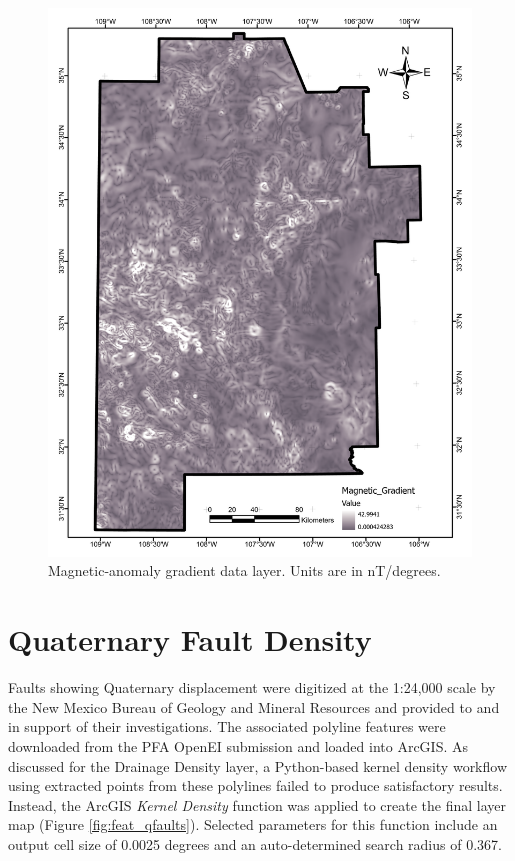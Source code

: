 \begin{figure}[H]
\centering
\includegraphics[width=0.75\linewidth]{templates/images/Figure-MagneticGradient.pdf}
\caption[Magnetic-anomaly gradient data layer]{Magnetic-anomaly gradient data layer. Units are in nT/degrees.}
\label{fig:feat_magnetic_gradient}
\end{figure}
\pagebreak

\section{Quaternary Fault Density}\label{app:dl_quat_fault_density}
Faults showing Quaternary displacement were digitized at the 1:24,000 scale by the New Mexico Bureau of Geology and Mineral Resources and provided to \citet{bielicki_hydrogeolgic_2015} and \citet{pepin_new_2019} in support of their investigations. The associated polyline features were downloaded from the PFA OpenEI submission \citep{kelley_geothermal_2015} and loaded into ArcGIS. As discussed for the Drainage Density layer, a Python-based kernel density workflow using extracted points from these polylines failed to produce satisfactory results. Instead, the ArcGIS \textit{Kernel Density} function was applied to create the final layer map (Figure \ref{fig:feat_qfaults}). Selected parameters for this function include an output cell size of 0.0025 degrees and an auto-determined search radius of 0.367.
\vfill
\pagebreak

